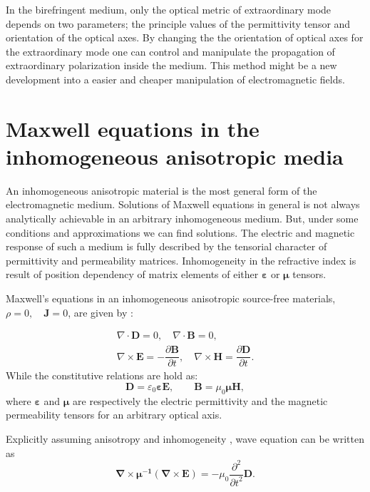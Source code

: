 \documentclass[9pt,twocolumn,twoside]{osajnl}
\begin{document}
In the birefringent medium,  only the optical metric of extraordinary mode depends on two parameters; the principle values of the permittivity tensor and orientation of the optical axes. By changing the the orientation of optical axes for the extraordinary mode one can control and manipulate the propagation of extraordinary polarization inside the medium. This method might be a new development into a easier and cheaper manipulation of electromagnetic fields.


\section{Maxwell equations in the inhomogeneous anisotropic media}\label{Maxwell's equations in the homogeneous anisotropic media}

An inhomogeneous anisotropic material is the most general form of the electromagnetic medium. Solutions of Maxwell equations in general is not always analytically achievable in an arbitrary inhomogeneous medium. But, under some conditions and approximations we can find solutions. 
The electric and magnetic response of such a medium is fully described by the tensorial character of permittivity and permeability matrices.
 Inhomogeneity in the refractive index is result of position dependency of matrix elements of either  $\boldsymbol{\varepsilon}$ or $\boldsymbol{\mu}$  tensors. 
 
 Maxwell's equations in an inhomogeneous anisotropic source-free materials, $\rho=0, \quad \mathbf{J}=0 $,  are given by \cite{jackson1962classical}:

\begin{gather}
\nabla\cdot \mathbf{D} =0,\quad \nabla\cdot \mathbf{B} =0, \nonumber \\
\nabla\times\mathbf{E}=-\dfrac{\partial\mathbf{B}}{\partial t}, \quad \nabla\times\mathbf{H} =\dfrac{\partial\mathbf{D}}{\partial t}.\label{m.h}
\end{gather}
While the constitutive relations are hold as:
 \begin{equation} 
 \mathbf {D}=\varepsilon_0 \boldsymbol \varepsilon \mathbf{E},  \qquad
  \mathbf{B}=\mu_0 \boldsymbol\mu \mathbf{H},
  \end{equation}
where $\boldsymbol{\varepsilon}$ and $\boldsymbol{\mu}$  are respectively the electric permittivity and  the magnetic permeability tensors for an arbitrary optical axis. 

 Explicitly assuming anisotropy and  inhomogeneity , wave equation can be written as
\begin{equation}
\mathbf{\nabla}\times{\boldsymbol{\mu^{-1}}(\mathbf{\nabla}\times\mathbf{E})}=-\mu_{0}\dfrac{\partial^{2}}{{\partial{t}}^{2}}\mathbf{D}.
\label{eq3}
\end{equation}
\end{document}
